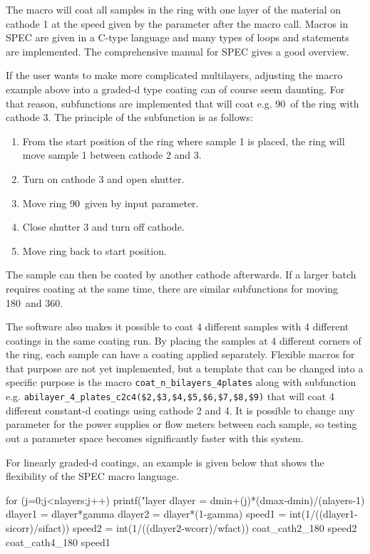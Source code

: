 The macro will coat all samples in the ring with one layer of the material on cathode 1 at the speed given by the parameter after the macro call. Macros in SPEC are given in a C-type language and many types of loops and statements are implemented. The comprehensive manual for SPEC gives a good overview.

If the user wants to make more complicated multilayers, adjusting the macro example above into a graded-d type coating can of course seem daunting. For that reason, subfunctions are implemented that will coat e.g. 90\degr\ of the ring with cathode 3. The principle of the subfunction is as follows:

\begin{enumerate}
  \item From the start position of the ring where sample 1 is placed, the ring will move sample 1 between cathode 2 and 3.
  \item Turn on cathode 3 and open shutter.
  \item Move ring 90\degr\ given by input parameter.
  \item Close shutter 3 and turn off cathode.
  \item Move ring back to start position.
\end{enumerate}

The sample can then be coated by another cathode afterwards. If a larger batch requires coating at the same time, there are similar subfunctions for moving 180\degr\ and 360\degr.

The software also makes it possible to coat 4 different samples with 4 different coatings in the same coating run. By placing the samples at 4 different corners of the ring, each sample can have a coating applied separately. Flexible macros for that purpose are not yet implemented, but a template that can be changed into a specific purpose is the macro \verb|coat_n_bilayers_4plates| along with subfunction e.g. \verb|abilayer_4_plates_c2c4($2,$3,$4,$5,$6,$7,$8,$9)| that will coat 4 different constant-d coatings using cathode 2 and 4. It is possible to change any parameter for the power supplies or flow meters between each sample, so testing out a parameter space becomes significantly faster with this system.

For linearly graded-d coatings, an example is given below that shows the flexibility of the SPEC macro language.

\begin{verbcode}
  for (j=0;j<nlayers;j++){
    printf("\nStarting layer %
    dlayer = dmin+(j)*(dmax-dmin)/(nlayers-1)
    dlayer1 = dlayer*gamma
    dlayer2 = dlayer*(1-gamma)
    speed1 = int(1/((dlayer1-sicorr)/sifact))
    speed2 = int(1/((dlayer2-wcorr)/wfact))
    coat_cath2_180 speed2
    coat_cath4_180 speed1
    }
\end{verbcode}

